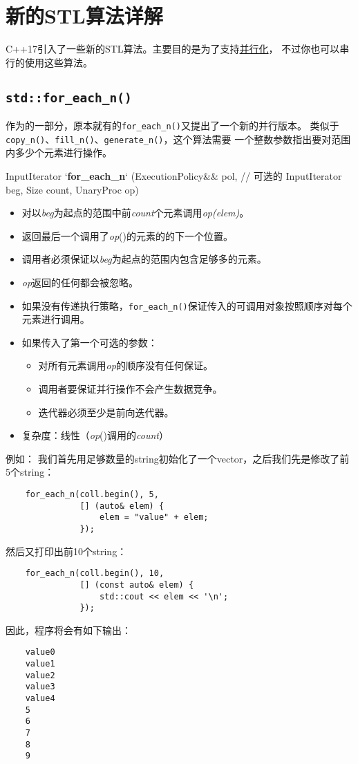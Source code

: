 \chapter{新的STL算法详解}\label{ch23}
C++17引入了一些新的STL算法。主要目的是为了支持\hyperref[ch22]{并行化}，
不过你也可以串行的使用这些算法。


\section{\texttt{std::for\_each\_n()}}
作为的一部分，原本就有的\texttt{for\_each\_n()}又提出了一个新的并行版本。
类似于\texttt{copy\_n()}、\texttt{fill\_n()}、\texttt{generate\_n()}，这个算法需要
一个整数参数指出要对范围内多少个元素进行操作。
\begin{blacklisting}
InputIterator
`\textbf{for\_each\_n}` (ExecutionPolicy&& pol,  // 可选的
            InputIterator beg,
            Size count,
            UnaryProc op)
\end{blacklisting}
\begin{itemize}
    \item 对以\emph{beg}为起点的范围中前\emph{count}个元素调用\emph{op(elem)}。
    \item 返回最后一个调用了\emph{op}()的元素的的下一个位置。
    \item 调用者必须保证以\emph{beg}为起点的范围内包含足够多的元素。
    \item \emph{op}返回的任何都会被忽略。
    \item 如果没有传递执行策略，\texttt{for\_each\_n()}保证传入的可调用对象按照顺序对每个元素进行调用。
    \item 如果传入了第一个可选的参数：
    \begin{itemize}
        \item 对所有元素调用\emph{op}的顺序没有任何保证。
        \item 调用者要保证并行操作不会产生数据竞争。
        \item 迭代器必须至少是前向迭代器。
    \end{itemize}
    \item 复杂度：线性（\emph{op}()调用的\emph{count}）
\end{itemize}
例如：
我们首先用足够数量的string初始化了一个vector，之后我们先是修改了前5个string：
\begin{lstlisting}
    for_each_n(coll.begin(), 5,
               [] (auto& elem) {
                   elem = "value" + elem;
               });
\end{lstlisting}
然后又打印出前10个string：
\begin{lstlisting}
    for_each_n(coll.begin(), 10,
               [] (const auto& elem) {
                   std::cout << elem << '\n';
               });
\end{lstlisting}
因此，程序将会有如下输出：
\begin{lstlisting}
    value0
    value1
    value2
    value3
    value4
    5
    6
    7
    8
    9
\end{lstlisting}


